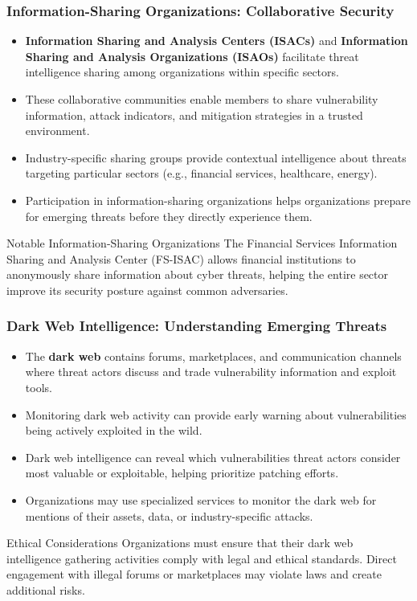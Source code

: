 \documentclass{beamer}
\begin{document}
\begin{frame}
\frametitle{Information-Sharing Organizations: Collaborative Security}
\begin{itemize}
\item \textbf{Information Sharing and Analysis Centers (ISACs)} and \textbf{Information Sharing and Analysis Organizations (ISAOs)} facilitate threat intelligence sharing among organizations within specific sectors.
\item These collaborative communities enable members to share vulnerability information, attack indicators, and mitigation strategies in a trusted environment.
\item Industry-specific sharing groups provide contextual intelligence about threats targeting particular sectors (e.g., financial services, healthcare, energy).
\item Participation in information-sharing organizations helps organizations prepare for emerging threats before they directly experience them.
\end{itemize}

\begin{exampleblock}{Notable Information-Sharing Organizations}
\scriptsize
The Financial Services Information Sharing and Analysis Center (FS-ISAC) allows financial institutions to anonymously share information about cyber threats, helping the entire sector improve its security posture against common adversaries.
\end{exampleblock}
\end{frame}

\begin{frame}
\frametitle{Dark Web Intelligence: Understanding Emerging Threats}
\begin{itemize}
\item The \textbf{dark web} contains forums, marketplaces, and communication channels where threat actors discuss and trade vulnerability information and exploit tools.
\item Monitoring dark web activity can provide early warning about vulnerabilities being actively exploited in the wild.
\item Dark web intelligence can reveal which vulnerabilities threat actors consider most valuable or exploitable, helping prioritize patching efforts.
\item Organizations may use specialized services to monitor the dark web for mentions of their assets, data, or industry-specific attacks.
\end{itemize}

\begin{alertblock}{Ethical Considerations}
\scriptsize
Organizations must ensure that their dark web intelligence gathering activities comply with legal and ethical standards. Direct engagement with illegal forums or marketplaces may violate laws and create additional risks.
\end{alertblock}
\end{frame}
\end{document}
